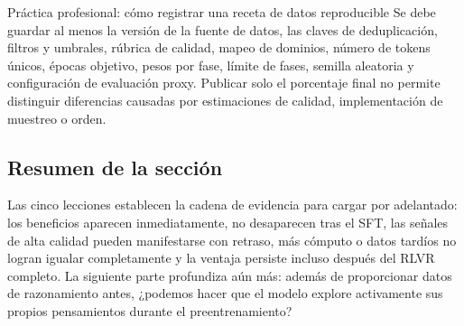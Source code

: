 \begin{knowledgebox}{Práctica profesional: cómo registrar una receta de datos reproducible}
Se debe guardar al menos la versión de la fuente de datos, las claves de deduplicación, filtros y umbrales, rúbrica de calidad, mapeo de dominios, número de tokens únicos, épocas objetivo, pesos por fase, límite de fases, semilla aleatoria y configuración de evaluación proxy. Publicar solo el porcentaje final no permite distinguir diferencias causadas por estimaciones de calidad, implementación de muestreo o orden.
\end{knowledgebox}

\subsection{Resumen de la sección}

Las cinco lecciones establecen la cadena de evidencia para cargar por adelantado: los beneficios aparecen inmediatamente, no desaparecen tras el SFT, las señales de alta calidad pueden manifestarse con retraso, más cómputo o datos tardíos no logran igualar completamente y la ventaja persiste incluso después del RLVR completo. La siguiente parte profundiza aún más: además de proporcionar datos de razonamiento antes, ¿podemos hacer que el modelo explore activamente sus propios pensamientos durante el preentrenamiento?
